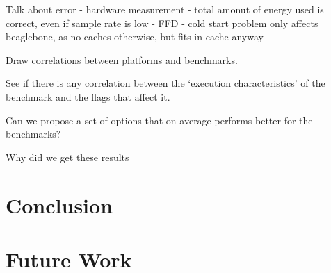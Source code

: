 \documentclass[twocolumn]{article}
\begin{document}
Talk about error
 - hardware measurement
 - total amonut of energy used is correct, even if sample rate is low
 - FFD
 - cold start problem
 	only affects beaglebone, as no caches otherwise, but fits in cache anyway


Draw correlations between platforms and benchmarks.

See if there is any correlation between the `execution characteristics' of the benchmark and the flags that affect it.

Can we propose a set of options that on average performs better for the benchmarks?

Why did we get these results


\section*{Conclusion}

\section*{Future Work}

\printbibliography
\end{document}
